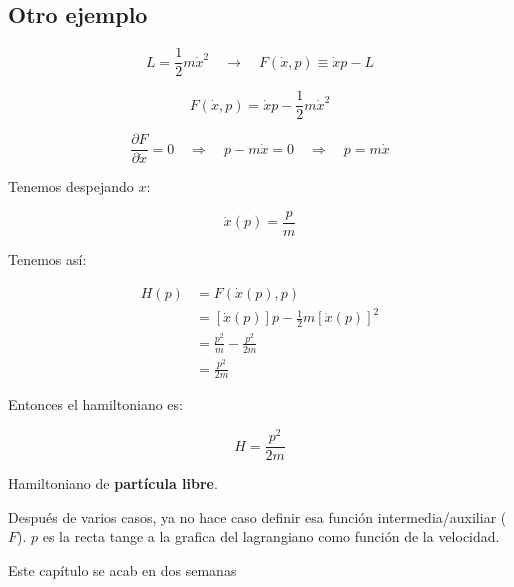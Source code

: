 \documentclass{article}
\begin{document}
\subsection{Otro ejemplo}

\[ L = \frac{1}{2} m\dot{x}^{2} \quad \to \quad F(\dot{x}, p) \equiv \dot{x}p-L  \]


\[ F(\dot{x},p) =\dot{x}p-\frac{1}{2}m\dot{x}^{2}   \]

\[ \frac{ \partial F }{\partial \dot{x}} =0 \quad \Rightarrow \quad p-m\dot{x}=0 \quad \Rightarrow \quad \boxed{p=m\dot{x}}\]


Tenemos despejando $x$:

\[ \dot{x}(p) = \frac{p}{m} \]




Tenemos así:





\begin{equation}
\begin{split}
H(p) &= F(\dot{x}(p), p) \\
&= \left[ \dot{x}(p)\right] p - \frac{1}{2} m \left[  \dot{x}(p) \right]^{2}\\
&= \frac{p^{2}}{m}- \frac{p^{2}}{2m}\\
&= \frac{p^{2}}{2m}
\end{split}
\end{equation}

Entonces el hamiltoniano es:

\[ \boxed{ H = \frac{p^{2}}{2m} } \]

Hamiltoniano de \textbf{partícula libre}.

Después de varios casos, ya no hace caso definir esa función intermedia/auxiliar ($F$). $p$ es la recta tange a la grafica del lagrangiano como función de la velocidad. 

Este capítulo se acab en dos semanas
\end{document}
